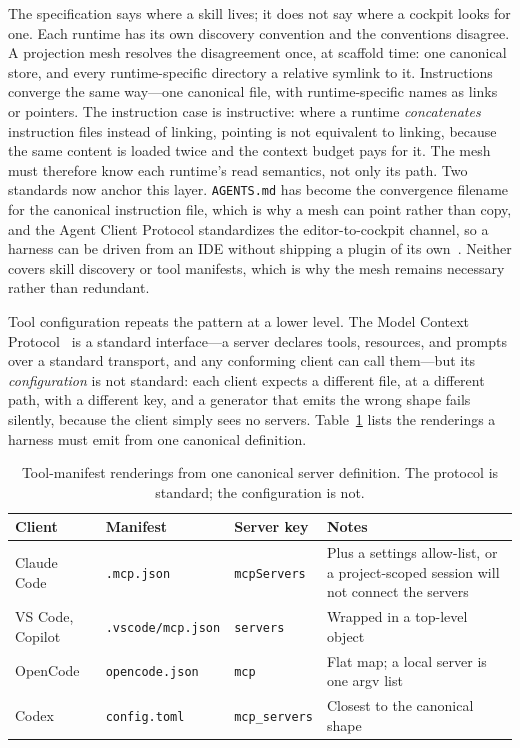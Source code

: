 \documentclass[10pt,a4paper]{article}
\theoremstyle{definition}
\theoremstyle{plain}
\theoremstyle{principle}
\newcommand{\file}[1]{\texttt{#1}}
\newcommand{\code}[1]{\texttt{#1}}
\begin{document}
The specification says where a skill lives; it does not say where a cockpit looks for one. Each
runtime has its own discovery convention and the conventions disagree. A projection mesh resolves
the disagreement once, at scaffold time: one canonical store, and every runtime-specific directory
a relative symlink to it. Instructions converge the same way---one canonical file, with
runtime-specific names as links or pointers. The instruction case is instructive: where a runtime
\emph{concatenates} instruction files instead of linking, pointing is not equivalent to linking,
because the same content is loaded twice and the context budget pays for it. The mesh must
therefore know each runtime's read semantics, not only its path. Two standards now anchor this
layer. \file{AGENTS.md} has become the convergence filename for the canonical instruction file,
which is why a mesh can point rather than copy, and the Agent Client Protocol standardizes the
editor-to-cockpit channel, so a harness can be driven from an IDE without shipping a plugin of its
own~\cite{acp}. Neither covers skill discovery or tool manifests, which is why the mesh remains
necessary rather than redundant.

Tool configuration repeats the pattern at a lower level. The Model Context Protocol~\cite{mcp} is
a standard interface---a server declares tools, resources, and prompts over a standard transport,
and any conforming client can call them---but its \emph{configuration} is not standard: each
client expects a different file, at a different path, with a different key, and a generator that
emits the wrong shape fails silently, because the client simply sees no servers.
Table~\ref{tab:mcp} lists the renderings a harness must emit from one canonical definition.

\begin{table}[htbp]
\centering
\caption{Tool-manifest renderings from one canonical server definition. The protocol is standard;
the configuration is not.}
\label{tab:mcp}
\small
\begin{tabularx}{\textwidth}{@{}p{2.5cm} >{\raggedright\arraybackslash}p{3.3cm} p{3.1cm} >{\raggedright\arraybackslash}X@{}}
\toprule
\textbf{Client} & \textbf{Manifest} & \textbf{Server key} & \textbf{Notes} \\
\midrule
Claude Code & \file{.mcp.json} & \code{mcpServers} & Plus a settings allow-list, or a project-scoped session will not connect the servers \\
VS Code, Copilot & \file{.vscode/mcp.json} & \code{servers} & Wrapped in a top-level object \\
OpenCode & \file{opencode.json} & \code{mcp} & Flat map; a local server is one argv list \\
Codex & \file{config.toml} & \code{mcp\_servers} & Closest to the canonical shape \\
\bottomrule
\end{tabularx}
\end{table}
\end{document}
